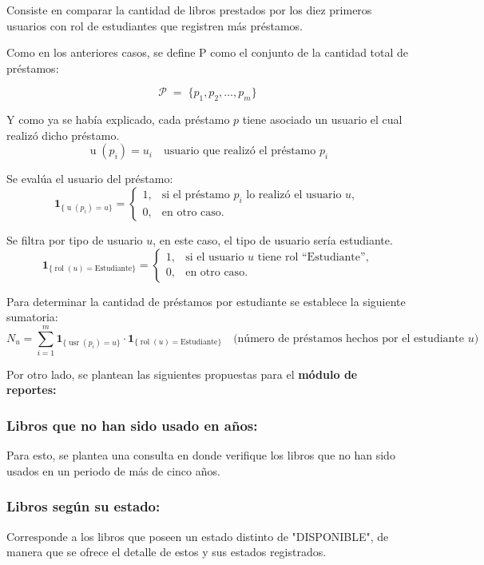 \documentclass[spanish]{ieee_upb}
\begin{document}
Consiste en comparar la cantidad de libros prestados por los diez primeros usuarios con rol de estudiantes que registren más préstamos. 

Como en los anteriores casos, se define P como el conjunto de la cantidad total de préstamos:

\[
  \mathcal{P}\;=\;\{
      p_1,p_2,\dots,p_m
  \}
\]

Y como ya se había explicado, cada préstamo \(p\) tiene asociado un usuario el cual realizó dicho préstamo.
\[
  \operatorname{u}(p_i)
  = u_i
  \quad\text{usuario que realizó el préstamo }p_i
\]
 
Se evalúa el usuario del préstamo:
\[
  \mathbf 1_{\{\operatorname{u}(p_i)=u\}}
  = 
  \begin{cases}
    1, & \text{si el préstamo }p_i\text{ lo realizó el usuario }u,\\[4pt]
    0, & \text{en otro caso.}
  \end{cases}
\]

Se filtra por tipo de usuario \(u\), en este caso, el tipo de usuario sería estudiante.
\[
  \mathbf 1_{\{\operatorname{rol}(u)=\text{Estudiante}\}}
  =
  \begin{cases}
    1, & \text{si el usuario }u\text{ tiene rol “Estudiante”,}\\[4pt]
    0, & \text{en otro caso.}
  \end{cases}
\]

Para determinar la cantidad de préstamos por estudiante se establece la siguiente sumatoria: 
\[
  N_{u}
  =
  \sum_{i=1}^{m}
     \mathbf 1_{\{\operatorname{usr}(p_i)=u\}}
     \cdot
     \mathbf 1_{\{\operatorname{rol}(u)=\text{Estudiante}\}}
  \quad
  \bigl(\text{número de préstamos hechos por el estudiante }u\bigr)
\]

\vspace{0.3cm}
Por otro lado, se plantean las siguientes propuestas para el \textbf{módulo de reportes:}

\subsubsection{Libros que no han sido usado en años: }Para esto, se plantea una consulta en donde verifique los libros que no han sido usados en un periodo de más de cinco años.
\subsubsection{Libros según su estado: } Corresponde a los libros que poseen un estado distinto de "DISPONIBLE", de manera que se ofrece el detalle de estos y sus estados registrados.
\end{document}
